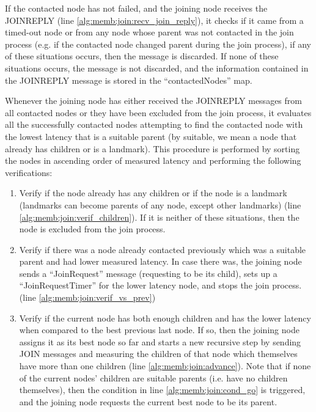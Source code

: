 If the contacted node has not failed, and the joining node receives the JOINREPLY (line \ref{alg:memb:join:recv_join_reply}), it checks if it came from a timed-out node or from any node whose parent was not contacted in the join process (e.g. if the contacted node changed parent during the join process), if any of these situations occurs, then the message is discarded. If none of these situations occurs, the message is not discarded, and the information contained in the JOINREPLY message is stored in the ``contactedNodes'' map.

Whenever the joining node has either received the JOINREPLY messages from all contacted nodes or they have been excluded from the join process, it evaluates all the successfully contacted nodes attempting to find the contacted node with the lowest latency that is a suitable parent (by suitable, we mean a node that already has children or is a landmark). This procedure is performed by sorting the nodes in ascending order of measured latency and performing the following verifications:

\begin{enumerate}
    \item Verify if the node already has any children or if the node is a landmark (landmarks can become parents of any node, except other landmarks) (line \ref{alg:memb:join:verif_children}). If it is neither of these situations, then the node is excluded from the join process. 
    
    \item Verify if there was a node already contacted previously which was a suitable parent and had lower measured latency. In case there was, the joining node sends a ``JoinRequest'' message (requesting to be its child), sets up a ``JoinRequestTimer'' for the lower latency node, and stops the join process. (line \ref{alg:memb:join:verif_vs_prev})

    \item Verify if the current node has both enough children and has the lower latency when compared to the best previous last node. If so, then the joining node assigns it as its best node so far and starts a new recursive step by sending JOIN messages and measuring the children of that node which themselves have more than one children (line \ref{alg:memb:join:advance}). Note that if none of the current nodes' children are suitable parents (i.e. have no children themselves), then the condition in line \ref{alg:memb:join:cond_go} is triggered, and the joining node requests the current best node to be its parent.
\end{enumerate}

